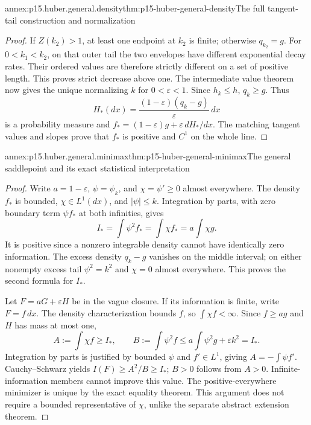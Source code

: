 \begin{annexitem}{annex:p15.huber.general.density}{thm:p15-huber-general-density}{The full tangent-tail construction and normalization}
\begin{proof}
If \(Z(k_2)>1\), at least one endpoint at \(k_2\) is finite;
otherwise \(q_{k_2}=g\). For \(0<k_1<k_2\), on that outer tail
the two envelopes have different exponential decay rates.
Their ordered values are therefore strictly different on a set
of positive length. This proves strict decrease above one.
The intermediate value theorem now gives the unique normalizing
\(k\) for \(0<\varepsilon<1\).
Since \(h_k\leq h\), \(q_k\geq g\). Thus
\[
 H_*(dx)=\frac{(1-\varepsilon)(q_k-g)}{\varepsilon}\,dx
\]
is a probability measure and
\(f_*=(1-\varepsilon)g+\varepsilon\,dH_*/dx\).
The matching tangent values and slopes prove that \(f_*\)
is positive and \(C^1\) on the whole line.
\end{proof}
\end{annexitem}

\begin{annexitem}{annex:p15.huber.general.minimax}{thm:p15-huber-general-minimax}{The general saddlepoint and its exact statistical interpretation}
\begin{proof}
Write \(a=1-\varepsilon\), \(\psi=\psi_k\), and
\(\chi=\psi'\geq0\) almost everywhere.
The density \(f_*\) is bounded, \(\chi\in L^1(dx)\), and
\(|\psi|\leq k\). Integration by parts, with zero boundary term
\(\psi f_*\) at both infinities, gives
\[
 I_*=\int\psi^2f_*=\int\chi f_*=a\int\chi g.
\]
It is positive since a nonzero integrable density cannot have
identically zero information. The excess density \(q_k-g\) vanishes
on the middle interval; on either nonempty excess tail
\(\psi^2=k^2\) and \(\chi=0\) almost everywhere.
This proves the second formula for \(I_*\).

Let \(F= aG+\varepsilon H\) be in the vague closure.
If its information is finite, write \(F=f\,dx\).
The density characterization bounds \(f\), so
\(\int\chi f<\infty\). Since \(f\geq ag\) and \(H\) has mass at most one,
\[
 A:=\int\chi f\geq I_*,
 \qquad B:=\int\psi^2f\leq a\int\psi^2g+\varepsilon k^2=I_* .
\]
Integration by parts is justified by bounded \(\psi\) and
\(f'\in L^1\), giving \(A=-\int\psi f'\).
Cauchy--Schwarz yields \(I(F)\geq A^2/B\geq I_*\);
\(B>0\) follows from \(A>0\).
Infinite-information members cannot improve this value.
The positive-everywhere minimizer is unique by the exact equality
theorem. This argument does not require a bounded representative
of \(\chi\), unlike the separate abstract extension theorem.


\end{proof}
\end{annexitem}
